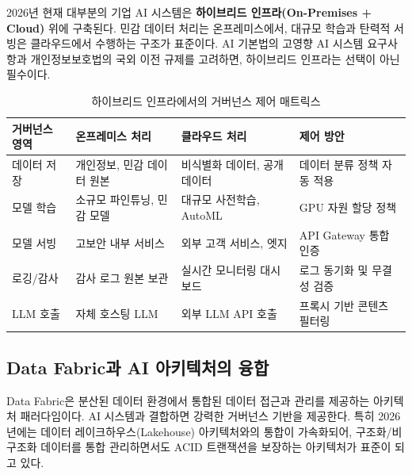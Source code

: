 2026년 현재 대부분의 기업 AI 시스템은 \textbf{하이브리드 인프라(On-Premises + Cloud)} 위에 구축된다. 민감 데이터 처리는 온프레미스에서, 대규모 학습과 탄력적 서빙은 클라우드에서 수행하는 구조가 표준이다. AI 기본법의 고영향 AI 시스템 요구사항과 개인정보보호법의 국외 이전 규제를 고려하면, 하이브리드 인프라는 선택이 아닌 필수이다.

\begin{table}[htbp]
\centering
\caption{하이브리드 인프라에서의 거버넌스 제어 매트릭스}
\label{tab:hybrid_infra_governance}
\begin{tabularx}{\textwidth}{p{2.5cm}p{3.5cm}p{3.5cm}X}
\toprule
\textbf{거버넌스 영역} & \textbf{온프레미스 처리} & \textbf{클라우드 처리} & \textbf{제어 방안} \\
\midrule
데이터 저장 & 개인정보, 민감 데이터 원본 & 비식별화 데이터, 공개 데이터 & 데이터 분류 정책 자동 적용 \\
\midrule
모델 학습 & 소규모 파인튜닝, 민감 모델 & 대규모 사전학습, AutoML & GPU 자원 할당 정책 \\
\midrule
모델 서빙 & 고보안 내부 서비스 & 외부 고객 서비스, 엣지 & API Gateway 통합 인증 \\
\midrule
로깅/감사 & 감사 로그 원본 보관 & 실시간 모니터링 대시보드 & 로그 동기화 및 무결성 검증 \\
\midrule
LLM 호출 & 자체 호스팅 LLM & 외부 LLM API 호출 & 프록시 기반 콘텐츠 필터링 \\
\bottomrule
\end{tabularx}
\end{table}


\subsection{Data Fabric과 AI 아키텍처의 융합}
\label{sec:13.1.4}

Data Fabric은 분산된 데이터 환경에서 통합된 데이터 접근과 관리를 제공하는 아키텍처 패러다임이다. AI 시스템과 결합하면 강력한 거버넌스 기반을 제공한다. 특히 2026년에는 데이터 레이크하우스(Lakehouse) 아키텍처와의 통합이 가속화되어, 구조화/비구조화 데이터를 통합 관리하면서도 ACID 트랜잭션을 보장하는 아키텍처가 표준이 되고 있다.

